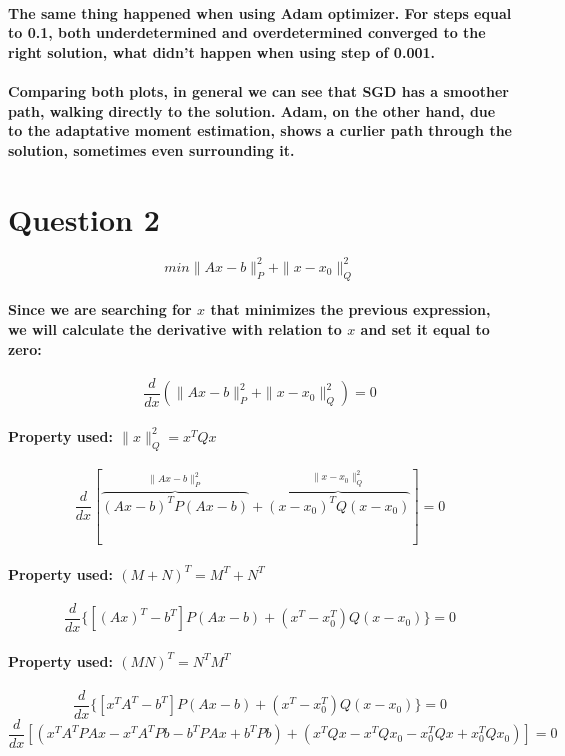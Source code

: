 \documentclass[a4paper]{article}    %
\begin{document}
\paragraph{The same thing happened when using Adam optimizer. For steps equal to 0.1, both underdetermined and overdetermined converged to the right solution, what didn't happen when using step of 0.001.}

\paragraph{Comparing both plots, in general we can see that SGD has a smoother path, walking directly to the solution. Adam, on the other hand, due to the adaptative moment estimation, shows a curlier path through the solution, sometimes even surrounding it.}

\newpage

\section*{Question 2}

\[min\|Ax-b\|_{P}^{2}+\|x-x_{0}\|_{Q}^{2}\]
\paragraph{Since we are searching for $x$ that minimizes the previous expression, we will calculate the derivative with relation to $x$ and set it equal to zero:}
    \[\frac{d}{dx} (\|Ax-b\|_{P}^{2}+\|x-x_{0}\|_{Q}^{2}) = 0\]
\paragraph{Property used: $\|x\|_{Q}^{2} = x^{T}Qx$}
    \[\frac{d}{dx} [\overbrace{(Ax-b)^{T} P (Ax-b)}^{\|Ax-b\|_{P}^{2}} + \overbrace{(x-x_0)^T Q (x-x_0)}^{\|x-x_{0}\|_{Q}^{2}}] = 0\]
\paragraph{Property used: $(M + N)^T = M^T + N^T$}
    \[\frac{d}{dx} \{[(Ax)^T-b^T] P (Ax-b) + (x^T-x_0^T) Q (x-x_0)\} = 0\]
\paragraph{Property used: $(MN)^T = N^T M^T$}
    \[\frac{d}{dx} \{[x^TA^T-b^T] P (Ax-b) + (x^T-x_0^T) Q (x-x_0)\} = 0\]
    \[\frac{d}{dx} [(x^TA^TPAx - x^TA^TPb -b^TPAx + b^TPb) + (x^TQx - x^TQx_0 - x_0^TQx + x_0^TQx_0)] = 0\]
\end{document}
